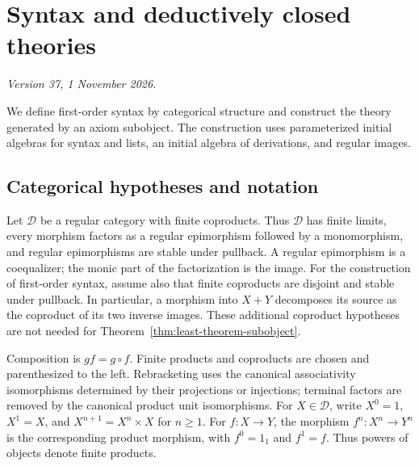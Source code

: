 \documentclass[11pt]{article}
\theoremstyle{definition}\newtheorem{definition}[theorem]{Definition}
\begin{document}
\appendix
\section{Syntax and deductively closed theories}
\label{app:syntax-theories}
\noindent\textit{Version 37, 1 November 2026.}\par\medskip
\label{app:fork-proofs}

We define first-order syntax by categorical structure and construct
the theory generated by an axiom subobject. The construction uses
parameterized initial algebras for syntax and lists, an initial algebra
of derivations, and regular images.

\subsection{Categorical hypotheses and notation}
\label{app:categorical-hypotheses}

Let $\mathcal D$ be a regular category with finite coproducts.
Thus $\mathcal D$ has finite limits, every morphism factors as a
regular epimorphism followed by a monomorphism, and regular
epimorphisms are stable under pullback. A regular epimorphism is a
coequalizer; the monic part of the factorization is the image.
For the construction of first-order syntax, assume also that finite
coproducts are disjoint and stable under pullback. In particular,
a morphism into $X+Y$ decomposes its source as the coproduct of its
two inverse images. These additional coproduct hypotheses are not
needed for Theorem~\ref{thm:least-theorem-subobject}.

Composition is $gf=g\circ f$. Finite products and coproducts are
chosen and parenthesized to the left. Rebracketing uses the canonical
associativity isomorphisms determined by their projections or injections;
terminal factors are removed by the canonical product unit isomorphisms.
For $X\in\mathcal D$, write $X^0=1$, $X^1=X$, and
$X^{n+1}=X^n\times X$ for $n\geq1$.
For $f:X\to Y$, the morphism $f^n:X^n\to Y^n$ is the corresponding
product morphism, with $f^0=1_1$ and $f^1=f$.
Thus powers of objects denote finite products.
\end{document}
